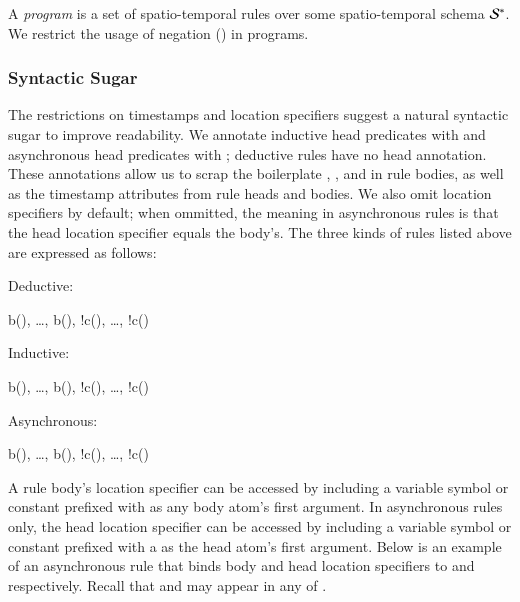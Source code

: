 A \lang \emph{program} is a set of spatio-temporal rules over some
spatio-temporal schema $\stschema$.  We restrict the usage of negation
(\dedalus{!}) in \lang programs.

\subsubsection{Syntactic Sugar}
The restrictions on timestamps and location specifiers suggest a natural
syntactic sugar to improve readability.  We annotate inductive head predicates
with  and asynchronous head predicates with ;
deductive rules have no head annotation.  These annotations allow us to scrap
the boilerplate , ,  and
 in rule bodies, as well as the timestamp attributes from rule
heads and bodies.  We also omit location specifiers by default; when ommitted,
the meaning in asynchronous rules is that the head location specifier equals the
body's.  The three kinds of rules listed above are expressed as follows:

Deductive:

\begin{Drules}
        {b(), \ldots, b(), !c(), \ldots, !c()}
\end{Drules}

Inductive:

\begin{Drules}
        {b(), \ldots, b(), !c(), \ldots, !c()}
\end{Drules}

Asynchronous:

\begin{Drules}
        {b(), \ldots, b(), !c(), \ldots, !c()}
\end{Drules}

A rule body's location specifier can be accessed by including a variable symbol or constant prefixed with \dedalus{#} as any body atom's first argument.  In asynchronous rules only, the head location specifier can be accessed by including a variable symbol or constant prefixed with a \dedalus{#} as the head atom's first argument.  Below is an example of an asynchronous rule that binds body and head location specifiers to  and  respectively.  Recall that  and  may appear in any of .

